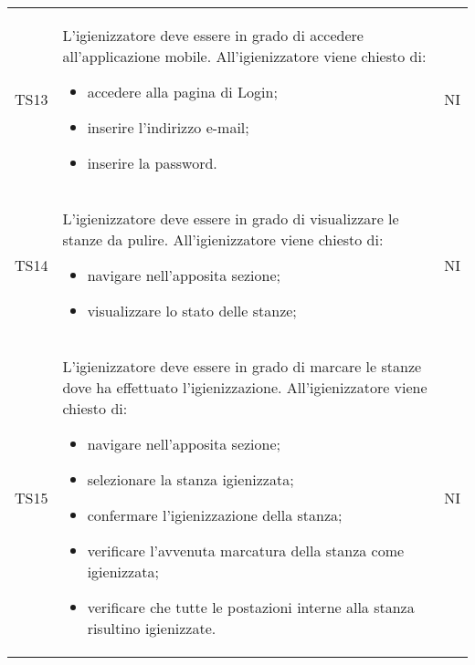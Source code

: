 {\begin{longtable}{ c C{11cm} c }
        TS13&
        \begin{flushleft}
            L'igienizzatore deve essere in grado di accedere all'applicazione mobile.
            All'igienizzatore viene chiesto di:
        \end{flushleft}
        \begin{itemize}
            \item accedere alla pagina di Login;
            \item inserire l'indirizzo e-mail;
            \item inserire la password.
        \end{itemize}&
        NI\\

        TS14&
        \begin{flushleft}
            L'igienizzatore deve essere in grado di visualizzare le stanze da pulire.
            All'igienizzatore viene chiesto di:
        \end{flushleft}
        \begin{itemize}
            \item navigare nell'apposita sezione;
            \item visualizzare lo stato delle stanze;
        \end{itemize}&
        NI\\

        TS15&
        \begin{flushleft}
            L'igienizzatore deve essere in grado di marcare le stanze dove ha effettuato l'igienizzazione.
            All'igienizzatore viene chiesto di:
        \end{flushleft}
        \begin{itemize}
            \item navigare nell'apposita sezione;
            \item selezionare la stanza igienizzata;
            \item confermare l'igienizzazione della stanza;
            \item verificare l'avvenuta marcatura della stanza come igienizzata;
            \item verificare che tutte le postazioni interne alla stanza risultino igienizzate.
        \end{itemize}&
        NI\\


\end{longtable}}
